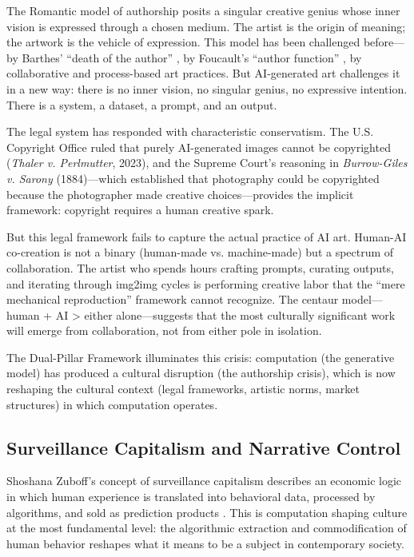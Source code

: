 \documentclass[11pt,a4paper]{article}
\begin{document}
The Romantic model of authorship posits a singular creative genius whose inner vision is expressed through a chosen medium. The artist is the origin of meaning; the artwork is the vehicle of expression. This model has been challenged before---by Barthes' ``death of the author'' \citep{barthes1967}, by Foucault's ``author function'' \citep{foucault1969}, by collaborative and process-based art practices. But AI-generated art challenges it in a new way: there is no inner vision, no singular genius, no expressive intention. There is a system, a dataset, a prompt, and an output.

The legal system has responded with characteristic conservatism. The U.S. Copyright Office ruled that purely AI-generated images cannot be copyrighted (\emph{Thaler v. Perlmutter}, 2023), and the Supreme Court's reasoning in \emph{Burrow-Giles v. Sarony} (1884)---which established that photography could be copyrighted because the photographer made creative choices---provides the implicit framework: copyright requires a human creative spark.

But this legal framework fails to capture the actual practice of AI art. Human-AI co-creation is not a binary (human-made vs. machine-made) but a spectrum of collaboration. The artist who spends hours crafting prompts, curating outputs, and iterating through img2img cycles is performing creative labor that the ``mere mechanical reproduction'' framework cannot recognize. The centaur model---human + AI > either alone---suggests that the most culturally significant work will emerge from collaboration, not from either pole in isolation.

The Dual-Pillar Framework illuminates this crisis: computation (the generative model) has produced a cultural disruption (the authorship crisis), which is now reshaping the cultural context (legal frameworks, artistic norms, market structures) in which computation operates.

\subsection{Surveillance Capitalism and Narrative Control}

Shoshana Zuboff's concept of surveillance capitalism describes an economic logic in which human experience is translated into behavioral data, processed by algorithms, and sold as prediction products \citep{zuboff2019}. This is computation shaping culture at the most fundamental level: the algorithmic extraction and commodification of human behavior reshapes what it means to be a subject in contemporary society.
\end{document}
